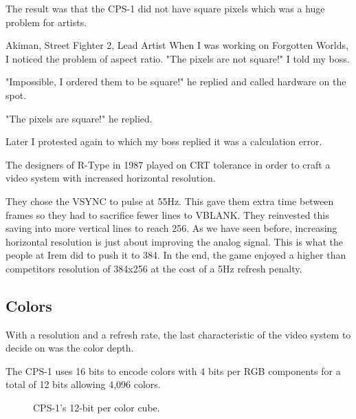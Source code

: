 
The result was that the CPS-1 did not have square pixels which was a huge problem for artists.  

\begin{q}{Akiman, Street Fighter 2, Lead Artist\cite{akiman}}
When I was working on Forgotten Worlds, I noticed the problem of aspect ratio. "The pixels are not square!" I told my boss.

"Impossible, I ordered them to be square!" he replied and called hardware on the spot.

"The pixels are square!" he replied. 

Later I protested again to which my boss replied it was a calculation error.
\end{q}


\begin{trivia}
The designers of R-Type in 1987 played on CRT tolerance in order to craft a video system with increased horizontal resolution. 

They chose the VSYNC to pulse at 55Hz. This gave them extra time between frames so they had to sacrifice fewer lines to VBLANK. They reinvested this saving into more vertical lines to reach 256. As we have seen before, increasing horizontal resolution is just about improving the analog signal. This is what the people at Irem did to push it to 384. In the end, the game enjoyed a higher than competitors resolution of 384x256 at the cost of a 5Hz refresh penalty.
\end{trivia}



\subsection{Colors}
With a resolution and a refresh rate, the last characteristic of the video system to decide on was the color depth. 

The CPS-1 uses 16 bits to encode colors with 4 bits per RGB components for a total of 12 bits allowing 4,096 colors. 


\begin{figure}[H]
\begin{minipage}[t]{0.49\linewidth}
\end{minipage}%
\hfill%
\begin{minipage}[t]{0.49\linewidth}
\end{minipage}
\caption*{CPS-1's 12-bit per color cube.}
\end{figure}
  
